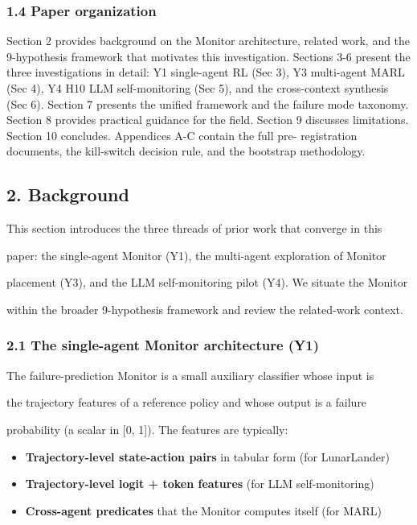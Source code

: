 \documentclass[11pt]{article}
\begin{document}
\subsubsection{1.4 Paper organization}\label{paper-organization}

Section 2 provides background on the Monitor architecture, related work,
and the 9-hypothesis framework that motivates this investigation.
Sections 3-6 present the three investigations in detail: Y1 single-agent
RL (Sec 3), Y3 multi-agent MARL (Sec 4), Y4 H10 LLM self-monitoring (Sec
5), and the cross-context synthesis (Sec 6). Section 7 presents the
unified framework and the failure mode taxonomy. Section 8 provides
practical guidance for the field. Section 9 discusses limitations.
Section 10 concludes. Appendices A-C contain the full pre- registration
documents, the kill-switch decision rule, and the bootstrap methodology.

\subsection{2. Background}\label{background}

This section introduces the three threads of prior work that converge in
this

paper: the single-agent Monitor (Y1), the multi-agent exploration of
Monitor

placement (Y3), and the LLM self-monitoring pilot (Y4). We situate the
Monitor

within the broader 9-hypothesis framework and review the related-work
context.

\subsubsection{2.1 The single-agent Monitor architecture
(Y1)}\label{the-single-agent-monitor-architecture-y1}

The failure-prediction Monitor is a small auxiliary classifier whose
input is

the trajectory features of a reference policy and whose output is a
failure

probability (a scalar in {[}0, 1{]}). The features are typically:

\begin{itemize}
\item
  \textbf{Trajectory-level state-action pairs} in tabular form (for
  LunarLander)
\item
  \textbf{Trajectory-level logit + token features} (for LLM
  self-monitoring)
\item
  \textbf{Cross-agent predicates} that the Monitor computes itself (for
  MARL)
\end{itemize}
\end{document}

